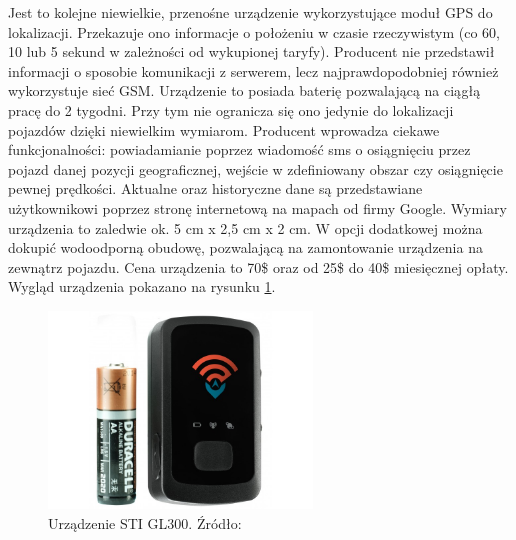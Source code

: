 \begin{itemize}
Jest to kolejne niewielkie, przenośne urządzenie wykorzystujące moduł GPS do lokalizacji. Przekazuje ono informacje o położeniu w czasie rzeczywistym (co 60, 10 lub 5 sekund w zależności od wykupionej taryfy). Producent nie przedstawił informacji o sposobie komunikacji z serwerem, lecz najprawdopodobniej również wykorzystuje sieć GSM. Urządzenie to posiada baterię pozwalającą na ciągłą pracę do 2 tygodni. Przy tym nie ogranicza się ono jedynie do lokalizacji pojazdów dzięki niewielkim wymiarom. Producent wprowadza ciekawe funkcjonalności: powiadamianie poprzez wiadomość sms o osiągnięciu przez pojazd danej pozycji geograficznej, wejście w zdefiniowany obszar czy osiągnięcie pewnej prędkości. Aktualne oraz historyczne dane są przedstawiane użytkownikowi poprzez stronę internetową na mapach od firmy Google. Wymiary urządzenia to zaledwie ok. 5 cm x 2,5 cm x 2 cm.  W opcji dodatkowej można dokupić wodoodporną obudowę, pozwalającą na zamontowanie urządzenia na zewnątrz pojazdu. Cena urządzenia to 70\$ oraz od 25\$ do 40\$ miesięcznej opłaty. Wygląd urządzenia pokazano na rysunku \ref{fig:image_sti_gl300}.
\begin{figure}[h]
	\centering
	\includegraphics[width=7cm]{img/introduction/sti_gl300.jpg}
	\caption{Urządzenie STI GL300. Źródło: \cite{gl300}}
	\label{fig:image_sti_gl300}
\end{figure}
\end{itemize}